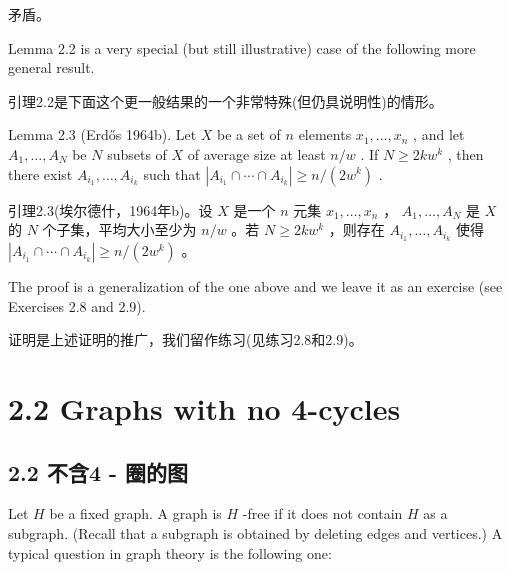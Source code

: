 \documentclass[10pt]{article}
\begin{document}
\begin{tcolorbox}\relax
矛盾。
\end{tcolorbox}

Lemma 2.2 is a very special (but still illustrative) case of the following more general result.

\begin{tcolorbox}\relax
引理2.2是下面这个更一般结果的一个非常特殊(但仍具说明性)的情形。
\end{tcolorbox}

Lemma 2.3 (Erdős 1964b). Let \(X\) be a set of \(n\) elements \({x}_{1},\ldots ,{x}_{n}\) , and let \({A}_{1},\ldots ,{A}_{N}\) be \(N\) subsets of \(X\) of average size at least \(n/w\) . If \(N \geq  {2k}{w}^{k}\) , then there exist \({A}_{{i}_{1}},\ldots ,{A}_{{i}_{k}}\) such that \(\left| {{A}_{{i}_{1}} \cap  \cdots  \cap  {A}_{{i}_{k}}}\right|  \geq  n/\left( {2{w}^{k}}\right)\) .

\begin{tcolorbox}\relax
引理2.3(埃尔德什，1964年b)。设 \(X\) 是一个 \(n\) 元集 \({x}_{1},\ldots ,{x}_{n}\) ， \({A}_{1},\ldots ,{A}_{N}\) 是 \(X\) 的 \(N\) 个子集，平均大小至少为 \(n/w\) 。若 \(N \geq  {2k}{w}^{k}\) ，则存在 \({A}_{{i}_{1}},\ldots ,{A}_{{i}_{k}}\) 使得 \(\left| {{A}_{{i}_{1}} \cap  \cdots  \cap  {A}_{{i}_{k}}}\right|  \geq  n/\left( {2{w}^{k}}\right)\) 。
\end{tcolorbox}

The proof is a generalization of the one above and we leave it as an exercise (see Exercises 2.8 and 2.9).

\begin{tcolorbox}\relax
证明是上述证明的推广，我们留作练习(见练习2.8和2.9)。
\end{tcolorbox}

\section*{2.2 Graphs with no 4-cycles}

\begin{tcolorbox}\relax
\section*{2.2 不含4 - 圈的图}
\end{tcolorbox}

Let \(H\) be a fixed graph. A graph is \(H\) -free if it does not contain \(H\) as a subgraph. (Recall that a subgraph is obtained by deleting edges and vertices.) A typical question in graph theory is the following one:
\end{document}
